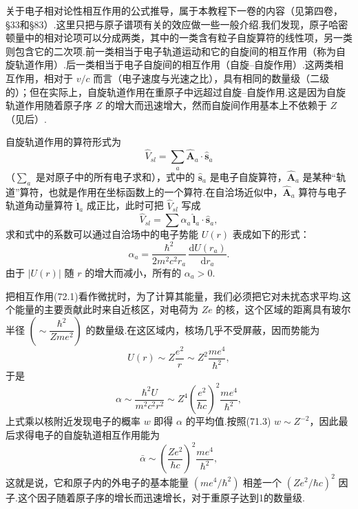 关于电子相对论性相互作用的公式推导，属于本教程下一卷的内容（见第四卷，§33和§83）.这里只把与原子谱项有关的效应做一些一般介绍.我们发现，原子哈密顿量中的相对论项可以分成两类，其中的一类含有粒子自旋算符的线性项，另一类则包含它的二次项.前一类相当于电子轨道运动和它的自旋间的相互作用（称为自旋轨道作用）.后一类相当于电子自旋间的相互作用（自旋–自旋作用）.这两类相互作用，相对于 $v/c$ 而言（电子速度与光速之比），具有相同的数量级（二级的）；但在实际上，自旋轨道作用在重原子中远超过自旋–自旋作用.这是因为自旋轨道作用随着原子序 $Z$ 的增大而迅速增大，然而自旋间作用基本上不依赖于 $Z$（见后）.

自旋轨道作用的算符形式为
\begin{equation}
  \hat{V}_{sl}=\sum_a\hat{\boldsymbol{A}}_a\cdot\hat{\boldsymbol{s}}_a
\end{equation}
（$\sum_a$ 是对原子中的所有电子求和），式中的 $\hat{\boldsymbol{s}}_a$ 是电子自旋算符，$\hat{\boldsymbol{A}}_a$ 是某种“轨道”算符，也就是作用在坐标函数上的一个算符.在自洽场近似中，$\hat{\boldsymbol{A}}_a$ 算符与电子轨道角动量算符 $\hat{\boldsymbol{l}}_a$ 成正比，此时可把 $\hat{V}_{sl}$ 写成
\begin{equation}
  \hat{V}_{sl}=\sum\alpha_a\,\hat{\boldsymbol{l}}_a\cdot\hat{\boldsymbol{s}}_a,
\end{equation}
求和式中的系数可以通过自洽场中的电子势能 $U(r)$ 表成如下的形式：
\begin{equation}
  \alpha_a=\frac{\hbar^{2}}{2m^{2}c^{2}r_a}\,\frac{\mathrm{d}U(r_a)}{\mathrm{d}r_a}.
\end{equation}
由于 $|U(r)|$ 随 $r$ 的增大而减小，所有的 $\alpha_a>0$.

把相互作用(72.1)看作微扰时，为了计算其能量，我们必须把它对未扰态求平均.这个能量的主要贡献此时来自近核区，对电荷为 $Ze$ 的核，这个区域的距离具有玻尔半径 $\left(\sim\dfrac{\hbar^{2}}{Zme^{2}}\right)$ 的数量级.在这区域内，核场几乎不受屏蔽，因而势能为
\begin{equation*}
  U(r)\sim Z\frac{e^{2}}{r}\sim Z^{2}\frac{me^{4}}{\hbar^{2}},
\end{equation*}
于是
\begin{equation*}
  \alpha\sim\frac{\hbar^{2}U}{m^{2}c^{2}r^{2}}
  \sim Z^{4}\left(\frac{e^{2}}{\hbar c}\right)^{2}\frac{me^{4}}{\hbar^{2}},
\end{equation*}
上式乘以核附近发现电子的概率 $w$ 即得 $\alpha$ 的平均值.按照(71.3) $w\sim Z^{-2}$，因此最后求得电子的自旋轨道相互作用能为
\begin{equation*}
  \bar{\alpha}\sim\left(\frac{Ze^{2}}{\hbar c}\right)^{2}\frac{me^{4}}{\hbar^{2}},
\end{equation*}
这就是说，它和原子内的外电子的基本能量 $\left(me^{4}/\hbar^{2}\right)$ 相差一个 $(Ze^{2}/\hbar c)^{2}$ 因子.这个因子随着原子序的增长而迅速增长，对于重原子达到1的数量级.

